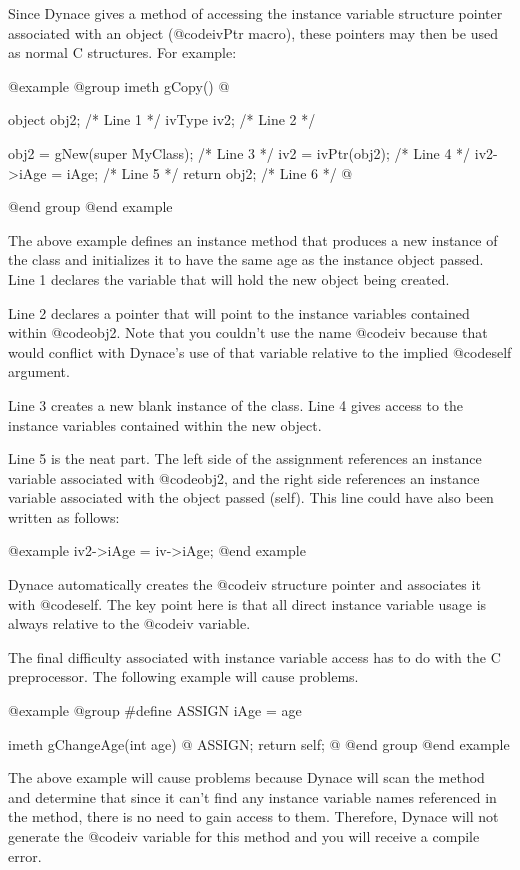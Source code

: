 Since Dynace gives a method of accessing the instance variable
structure pointer associated with an object (@code{ivPtr} macro), these
pointers may then be used as normal C structures.  For example:

@example
@group
imeth   gCopy()
@{
        object  obj2;                   /*  Line 1  */
        ivType  iv2;                    /*  Line 2  */

        obj2 = gNew(super MyClass);     /*  Line 3  */
        iv2  = ivPtr(obj2);             /*  Line 4  */
        iv2->iAge = iAge;               /*  Line 5  */
        return obj2;                    /*  Line 6  */
@}
@end group
@end example

The above example defines an instance method that produces a new
instance of the class and initializes it to have the same age as
the instance object passed.  Line 1 declares the variable that will hold
the new object being created.

Line 2 declares a pointer that will point to the instance variables contained
within @code{obj2}.  Note that you couldn't use the name @code{iv} because
that would conflict with Dynace's use of that variable relative to the
implied @code{self} argument.

Line 3 creates a new blank instance of the class.  Line 4 gives access
to the instance variables contained within the new object.

Line 5 is the neat part.  The left side of the assignment references
an instance variable associated with @code{obj2}, and the right side
references an instance variable associated with the object passed
(self).  This line could have also been written as follows:

@example
        iv2->iAge = iv->iAge;
@end example

Dynace automatically creates the @code{iv} structure pointer and
associates it with @code{self}.  The key point here is that
all direct instance variable usage is always relative to the @code{iv}
variable.

The final difficulty associated with instance variable access has to do
with the C preprocessor.  The following example will cause problems.

@example
@group
#define ASSIGN  iAge = age

imeth   gChangeAge(int age)
@{
        ASSIGN;
        return self;
@}
@end group
@end example

The above example will cause problems because Dynace will scan the
method and determine that since it can't find any instance variable
names referenced in the method, there is no need to gain access to them.
Therefore, Dynace will not generate the @code{iv} variable for this
method and you will receive a compile error.

